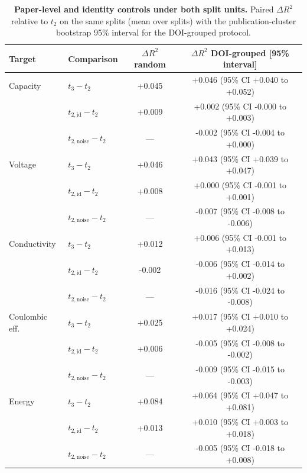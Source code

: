 \documentclass[11pt]{article}
\begin{document}
\begin{table}[t]
    \centering\small
    \caption{\textbf{Paper-level and identity controls under both split units.} Paired $\Delta R^2$ relative to $t_2$ on the same splits (mean over splits) with the publication-cluster bootstrap 95\% interval for the DOI-grouped protocol.}
    \label{tab:controls}
    \begin{tabular}{@{}llcc@{}}
        \toprule
        Target & Comparison & $\Delta R^2$ random & $\Delta R^2$ DOI-grouped [95\% interval] \\
        \midrule
        Capacity & $t_3 - t_2$ & +0.045 & +0.046 (95\% CI +0.040 to +0.052) \\
                 & $t_{2,\mathrm{id}} - t_2$ & +0.009 & +0.002 (95\% CI -0.000 to +0.003) \\
                 & $t_{2,\mathrm{noise}} - t_2$ & --- & -0.002 (95\% CI -0.004 to +0.000) \\
        \midrule
        Voltage  & $t_3 - t_2$ & +0.046 & +0.043 (95\% CI +0.039 to +0.047) \\
                 & $t_{2,\mathrm{id}} - t_2$ & +0.008 & +0.000 (95\% CI -0.001 to +0.001) \\
                 & $t_{2,\mathrm{noise}} - t_2$ & --- & -0.007 (95\% CI -0.008 to -0.006) \\
        \midrule
        Conductivity & $t_3 - t_2$ & +0.012 & +0.006 (95\% CI -0.001 to +0.013) \\
                 & $t_{2,\mathrm{id}} - t_2$ & -0.002 & -0.006 (95\% CI -0.014 to +0.002) \\
                 & $t_{2,\mathrm{noise}} - t_2$ & --- & -0.016 (95\% CI -0.024 to -0.008) \\
        \midrule
        Coulombic eff. & $t_3 - t_2$ & +0.025 & +0.017 (95\% CI +0.010 to +0.024) \\
                 & $t_{2,\mathrm{id}} - t_2$ & +0.006 & -0.005 (95\% CI -0.008 to -0.002) \\
                 & $t_{2,\mathrm{noise}} - t_2$ & --- & -0.009 (95\% CI -0.015 to -0.003) \\
        \midrule
        Energy   & $t_3 - t_2$ & +0.084 & +0.064 (95\% CI +0.047 to +0.081) \\
                 & $t_{2,\mathrm{id}} - t_2$ & +0.013 & +0.010 (95\% CI +0.003 to +0.018) \\
                 & $t_{2,\mathrm{noise}} - t_2$ & --- & -0.005 (95\% CI -0.018 to +0.008) \\
        \bottomrule
    \end{tabular}
\end{table}
\end{document}
